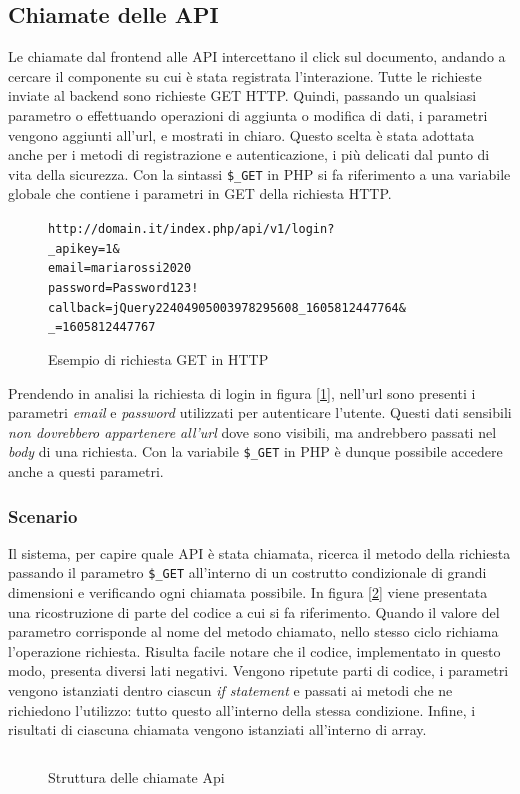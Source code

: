 \subsection{Chiamate delle API}
Le chiamate dal frontend alle API intercettano il click sul documento, andando a cercare il componente su cui è stata registrata l'interazione. Tutte le richieste inviate al backend sono richieste GET HTTP. Quindi, passando un qualsiasi parametro o effettuando operazioni di aggiunta o modifica di dati, i parametri vengono aggiunti all'url, e mostrati in chiaro. Questo scelta è stata adottata anche per i metodi di registrazione e autenticazione, i più delicati dal punto di vita della sicurezza. Con la sintassi \texttt{\$\_GET} in PHP si fa riferimento a una variabile globale che contiene i parametri in GET della richiesta HTTP.
\begin{figure}[H]
\begin{alltt}
    \centering
    http://domain.it/index.php/api/v1/login?
    \centering
    _apikey=1&
    email=mariarossi2020%
    password=Password123!
    callback=jQuery22404905003978295608_1605812447764&
    _=1605812447767
\end{alltt}
\caption{Esempio di richiesta GET in HTTP}
\label{fig:getlogin}
\end{figure}
Prendendo in analisi la richiesta di login in figura [\ref{fig:getlogin}], nell'url sono presenti i parametri \textsl{email} e \textsl{password} utilizzati per autenticare l'utente. Questi dati sensibili \textit{non dovrebbero appartenere all'url} dove sono visibili, ma andrebbero passati nel \emph{body} di una richiesta. Con la variabile \texttt{\$\_GET} in PHP è dunque possibile accedere anche a questi parametri.

\subsubsection{Scenario}
Il sistema, per capire quale API è stata chiamata, ricerca il metodo della richiesta passando il parametro \texttt{\$\_GET} all'interno di un costrutto condizionale di grandi dimensioni e verificando ogni chiamata possibile. In figura [\ref{fig:apicall}] viene presentata una ricostruzione di parte del codice a cui si fa riferimento. Quando il valore del parametro corrisponde al nome del metodo chiamato, nello stesso ciclo richiama l'operazione richiesta. Risulta facile notare che il codice, implementato in questo modo, presenta diversi lati negativi. Vengono ripetute parti di codice, i parametri vengono istanziati dentro ciascun \emph{if statement} e passati ai metodi che ne richiedono l'utilizzo: tutto questo all'interno della stessa condizione. Infine, i risultati di ciascuna chiamata vengono istanziati all'interno di array.
\begin{figure}
    \inputminted[firstline=2, lastline=15]{octave}{src/examples/old_api_call.php}
    \caption{Struttura delle chiamate Api}
    \label{fig:apicall}
\end{figure}

